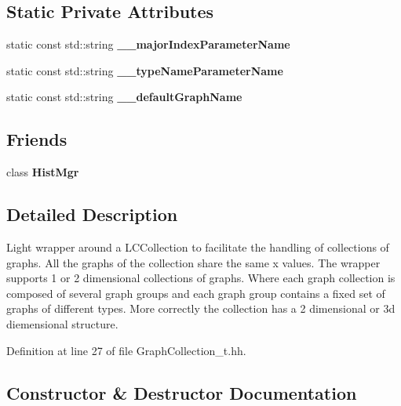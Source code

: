 \subsection*{Static Private Attributes}
\begin{DoxyCompactItemize}
\item 
static const std::string {\bfseries \_\-\_\-majorIndexParameterName}\label{classhistmgr_1_1GraphCollection__t_adaba3b377fc3c74c4b34fcae6b032849}

\item 
static const std::string {\bfseries \_\-\_\-typeNameParameterName}\label{classhistmgr_1_1GraphCollection__t_aab8c996982d62a8eab7cd537394a07b1}

\item 
static const std::string {\bfseries \_\-\_\-defaultGraphName}\label{classhistmgr_1_1GraphCollection__t_ad7c3d4148ee7dcfbab8485fb3e7872c0}

\end{DoxyCompactItemize}
\subsection*{Friends}
\begin{DoxyCompactItemize}
\item 
class {\bfseries HistMgr}\label{classhistmgr_1_1GraphCollection__t_a3cc85db784d7651390e41024125eb3a0}

\end{DoxyCompactItemize}


\subsection{Detailed Description}
Light wrapper around a LCCollection to facilitate the handling of collections of graphs. All the graphs of the collection share the same x values. The wrapper supports 1 or 2 dimensional collections of graphs. Where each graph collection is composed of several graph groups and each graph group contains a fixed set of graphs of different types. More correctly the collection has a 2 dimensional or 3d diemensional structure. 

Definition at line 27 of file GraphCollection\_\-t.hh.

\subsection{Constructor \& Destructor Documentation}
